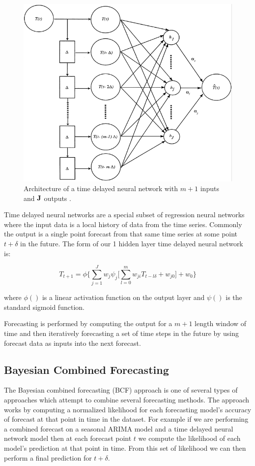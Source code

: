 \documentclass{acm_proc_article-sp}
\begin{document}
\begin{figure}[ht!]
\centering
\includegraphics[width = .8\linewidth]{time_delay_neural_network.png}
\caption{Architecture of a time delayed neural network with $m + 1$ inputs and $\bf{J}$ outputs \cite{Hansen2003}.}
\end{figure}

Time delayed neural networks are a special subset of regression neural networks where the input data is a local history of data from the time series.  Commonly the output is a single point forecast from that same time series at some point $t + \delta$ in the future.   The form of our 1 hidden layer time delayed neural network is:

\begin{equation}
T_{t + 1} = \phi \{ \sum_{j = 1}^{J} w_{j}\psi_{j} \bigg[ \sum_{l = 0}^{m}w_{ji}T_{t - l\delta} + w_{j0} \bigg] + w_0 \}
\end{equation}

\noindent where $\phi()$ is a linear activation function on the output layer and $\psi()$ is the standard sigmoid function.

Forecasting is performed by computing the output for a $m + 1$ length window of time and then iteratively forecasting a set of time steps in the future by using forecast data as inputs into the next forecast. 

\subsection{Bayesian Combined Forecasting}

The Bayesian combined forecasting (BCF) approach is one of several types of approaches which attempt to combine several forecasting methods.  The approach works by computing a normalized likelihood for each forecasting model's accuracy of forecast at that point in time in the dataset.  For example if we are performing a combined forecast on a seasonal ARIMA model and a time delayed neural network model then at each forecast point $t$ we compute the likelihood of each model's prediction at that point in time.  From this set of likelihood we can then perform a final prediction for $t + \delta$.
\end{document}
